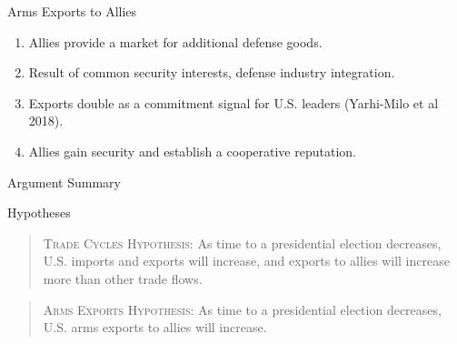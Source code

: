 \documentclass[12pt]{beamer}
\begin{document}

\begin{frame}{Arms Exports to Allies}

\pause 
\begin{enumerate} 
\item Allies provide a market for additional defense goods.
\pause 
\item Result of common security interests, defense industry integration. 
\pause
\item Exports double as a commitment signal for U.S. leaders (Yarhi-Milo et al 2018). 
\pause
\item Allies gain security and establish a cooperative reputation.
\end{enumerate}


\end{frame} 


\begin{frame}[fragile]{Argument Summary}

\begin{figure}[htpb]
\end{figure}

\end{frame} 



\begin{frame}[fragile]{Hypotheses}

\begin{quote}
\textsc{Trade Cycles Hypothesis}: As time to a presidential election decreases, U.S. imports and exports will increase, and exports to allies will increase more than other trade flows.
\end{quote}
\pause

\vspace{5mm}

\begin{quote}
\textsc{Arms Exports Hypothesis}: As time to a presidential election decreases, U.S. arms exports to allies will increase.
\end{quote}

\end{frame}
\end{document}

